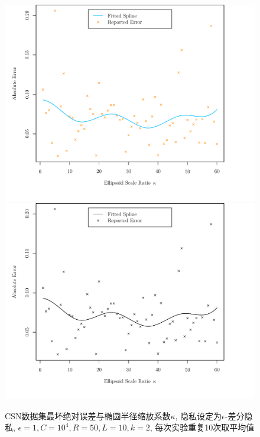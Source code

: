 \begin{figure}[hbtp]\centering
  \caption{CSN数据集最坏绝对误差与椭圆半径缩放系数$\kappa$, 隐私设定为$\epsilon$-差分隐私, $\epsilon = 1, C = 10^4, R = 50, L = 10, k = 2$,  每次实验重复10次取平均值}\label{fig:CSN数据集最坏绝对误差与椭圆半径缩放系数_kappa}
  \makeatletter
  \ifHy@colorlinks
  \includegraphics[width=140mm]{fig/fig_CSN.pdf}
  \else
  \includegraphics[width=140mm]{fig/fig_CSN_bw.pdf}
  \fi
  \makeatother
\end{figure}
